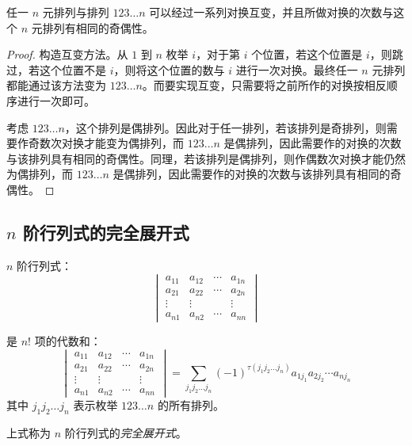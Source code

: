 \begin{theorem}
	任一 $n$ 元排列与排列 $123 \ldots n$ 可以经过一系列对换互变，并且所做对换的次数与这个 $n$ 元排列有相同的奇偶性。
\end{theorem}

\begin{proof}
	构造互变方法。从 $1$ 到 $n$ 枚举 $i$，对于第 $i$ 个位置，若这个位置是 $i$，则跳过，若这个位置不是 $i$，则将这个位置的数与 $i$ 进行一次对换。最终任一 $n$ 元排列都能通过该方法变为 $123 \ldots n$。而要实现互变，只需要将之前所作的对换按相反顺序进行一次即可。

	考虑 $123 \ldots n$，这个排列是偶排列。因此对于任一排列，若该排列是奇排列，则需要作奇数次对换才能变为偶排列，而 $123 \ldots n$ 是偶排列，因此需要作的对换的次数与该排列具有相同的奇偶性。同理，若该排列是偶排列，则作偶数次对换才能仍然为偶排列，而 $123 \ldots n$ 是偶排列，因此需要作的对换的次数与该排列具有相同的奇偶性。
\end{proof}

\subsection{$n$ 阶行列式的完全展开式}

\begin{theorem}[行列式的完全展开式]
	$n$ 阶行列式：
	$$
	\begin{vmatrix}
		a_{11} & a_{12} & \cdots & a_{1n}
		\\
		a_{21} & a_{22} & \cdots & a_{2n}
		\\
		\vdots & \vdots &  & \vdots
		\\
		a_{n1} & a_{n2} & \cdots & a_{nn}
		\end{vmatrix}
	$$

	是 $n!$ 项的代数和：
	$$
	\begin{vmatrix}
		a_{11} & a_{12} & \cdots & a_{1n}
		\\
		a_{21} & a_{22} & \cdots & a_{2n}
		\\
		\vdots & \vdots &  & \vdots
		\\
		a_{n1} & a_{n2} & \cdots & a_{nn}
		\end{vmatrix} =
		\sum_{j_1 j_2 \ldots j_n} (-1)^{\tau(j_1 j_2 \ldots j_n)} a_{1j_1} a_{2j_2} \cdots a_{nj_n}
	$$
	其中 $j_1 j_2 \ldots j_n$ 表示枚举 $123 \ldots n$ 的所有排列。

	上式称为 $n$ 阶行列式的\emph{完全展开式}。
\end{theorem}

